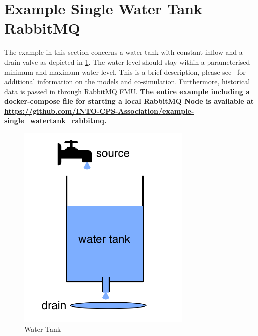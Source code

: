 \section{Example Single Water Tank RabbitMQ}\label{sec:example-watertank}
The example in this section concerns a water tank with constant inflow and a
drain valve as depicted in \cref{fig:water-tank-picture}. The water level should
stay within a parameterised minimum and maximum water level. This is a brief
description, please see~\cite{INTOCPSD3.6} for additional information on
the models and co-simulation. Furthermore, historical data is passed in through
RabbitMQ FMU. \textbf{The entire example including a docker-compose file for
  starting a local RabbitMQ Node is available at \url{https://github.com/INTO-CPS-Association/example-single_watertank_rabbitmq}.}
\begin{figure}[!htb]
  \centering
  \includegraphics[]{figures/water-tank-picture.png}
  \caption{Water Tank}
  \label{fig:water-tank-picture}
\end{figure}


